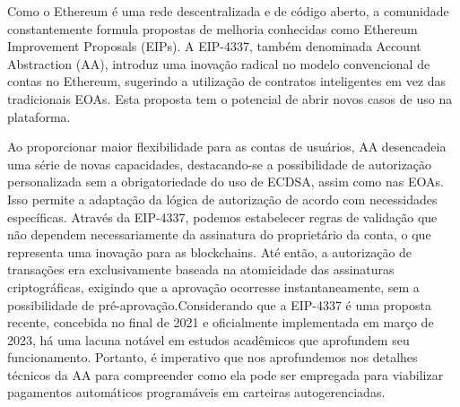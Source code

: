 \documentclass[12pt]{article}
\begin{document}
Como o Ethereum é uma rede descentralizada e de código aberto, a comunidade constantemente formula
propostas de melhoria conhecidas como Ethereum Improvement Proposals (EIPs). A EIP-4337\cite{5},
também denominada Account Abstraction (AA), introduz uma inovação radical no modelo convencional de
contas no Ethereum, sugerindo a utilização de contratos inteligentes em vez das tradicionais EOAs.
Esta proposta tem o potencial de abrir novos casos de uso na plataforma.

Ao proporcionar maior flexibilidade para as contas de usuários, AA desencadeia uma série de novas
capacidades, destacando-se a possibilidade de autorização personalizada sem a obrigatoriedade do
uso de ECDSA, assim como nas EOAs. Isso permite a adaptação da lógica de autorização de acordo com
necessidades específicas. Através da EIP-4337, podemos estabelecer regras de validação que não
dependem necessariamente da assinatura do proprietário da conta, o que representa uma inovação para
as blockchains. Até então, a autorização de transações era exclusivamente baseada na atomicidade
das assinaturas criptográficas, exigindo que a aprovação ocorresse instantaneamente, sem a
possibilidade de pré-aprovação.Considerando que a EIP-4337 é uma proposta recente, concebida no
final de 2021 e oficialmente implementada em março de 2023, há uma lacuna notável em estudos
acadêmicos que aprofundem seu funcionamento. Portanto, é imperativo que nos aprofundemos nos
detalhes técnicos da AA para compreender como ela pode ser empregada para viabilizar pagamentos
automáticos programáveis em carteiras autogerenciadas.



\end{document}
